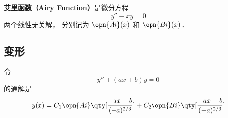 
\begin{issues}
\issueDraft
\end{issues}

\textbf{艾里函数（Airy Function）}是微分方程
\begin{equation}
y'' - xy = 0
\end{equation}
两个线性无关解， 分别记为 $\opn{Ai}(x)$ 和 $\opn{Bi}(x)$．


\subsection{变形}
令 $$
\begin{equation}
y'' + (ax + b) y = 0
\end{equation}
的通解是
\begin{equation}
y(x) = C_1\opn{Ai}\qty[\frac{-ax-b}{(-a)^{2/3}}] + C_2 \opn{Bi}\qty[\frac{-ax-b}{(-a)^{2/3}}]
\end{equation}

